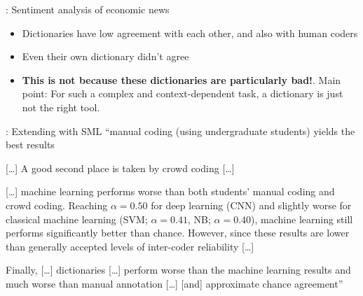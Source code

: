 \documentclass[compress]{beamer}
\begin{document}
\begin{frame}{\cite{Boukes2020}: Sentiment analysis of economic news}
	\begin{itemize}
		\item Dictionaries have low agreement with each other, and also with human coders
		\item Even their own dictionary didn't agree
		\item \textbf{This is not because these dictionaries are particularly bad!}. Main point: For such a complex and context-dependent task, a dictionary is just not the right tool.
	\end{itemize}
\end{frame}




\begin{frame}{\cite{VanAtteveldt2021}: Extending \cite{Boukes2020} with SML}
	``manual coding (using undergraduate students) yields the
	best results 
	
	[\ldots] A good second place is taken by crowd coding [\ldots]  
	
	
	[\ldots] machine learning performs worse than both students' manual coding and crowd coding.
	Reaching $\alpha = 0.50$ for deep learning (CNN) and slightly worse for classical machine learning (SVM; $\alpha = 0.41$, NB; $\alpha = 0.40$), machine learning still performs significantly better than chance. However, since these results are lower than generally accepted levels of inter-coder reliability [\ldots]
	
	Finally, [\ldots] dictionaries [\ldots] perform worse than the machine
	learning results and much worse than manual annotation [\ldots] [and] approximate chance agreement''\end{frame}
\end{document}
